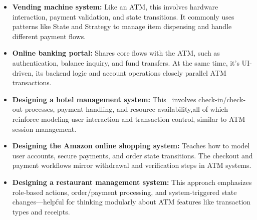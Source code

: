 \begin{itemize}
\item
\protect{}\label{0TkfoJzlF8W5HuBtrQKw4}
\textbf{Vending machine system:} Like an ATM, this involves hardware interaction, payment validation, and state transitions. It commonly uses patterns like State and Strategy to manage item dispensing and handle different payment flows.
\item
\protect{}\label{yJmkVds5_vfT-c5BeEjzp}
\textbf{Online banking portal:} Shares core flows with the ATM, such as authentication, balance inquiry, and fund transfers. At the same time, it's UI-driven, its backend logic and account operations closely parallel ATM transactions.
\item
\protect{}\label{FUvvhsyEQxyUQPv4QKurp}
\textbf{Designing a hotel management system:} This~ involves check-in/check-out processes, payment handling, and resource availability,all of which reinforce modeling user interaction and transaction control, similar to ATM session management.
\item
\protect{}\label{qv5bMSITJQ6-ANj18ECtj}
\textbf{Designing the Amazon online shopping system:} Teaches how to model user accounts, secure payments, and order state transitions. The checkout and payment workflows mirror withdrawal and verification steps in ATM systems.
\item
\protect{}\label{uZeIDPMmj_LEXMf_4NU3c}
\textbf{Designing a restaurant management system:} This approach emphasizes role-based actions, order/payment processing, and system-triggered state changes---helpful for thinking modularly about ATM features like transaction types and receipts.
\end{itemize}

